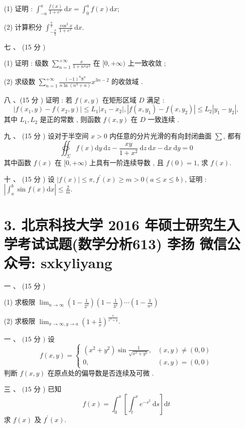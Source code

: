 \documentclass[10pt]{article}
\begin{document}
{(1)  证明 : $\int_{-a}^{a} \frac{f(x)}{1+e^{x}} \mathrm{~d} x=\int_{0}^{a} f(x) \mathrm{d} x$;

(2)  计算积分  $\int_{-\frac{\pi}{2}}^{\frac{\pi}{2}} \frac{\cos ^{3} x}{1+e^{x}} \mathrm{~d} x$.

 七 、 (15  分 )

(1)  证明 :  级数  $\sum_{n=1}^{+\infty} \frac{x}{1+n^{4} x^{2}}$  在  $[0,+\infty)$  上一致收敛 ;

(2)  求级数  $\sum_{n=1}^{+\infty} \frac{(-1)^{n} 8^{n}}{n \ln \left(n^{3}+n\right)} x^{3 n-2}$  的收敛域 .

 八 、(15  分 )  证明 :  若  $f(x, y)$  在矩形区域  $D$  满足 :
$$
\left|f\left(x_{1}, y\right)-f\left(x_{2}, y\right)\right| \leq L_{1}\left|x_{1}-x_{2}\right|,\left|f\left(x, y_{1}\right)-f\left(x, y_{2}\right)\right| \leq L_{2}\left|y_{1}-y_{2}\right|,
$$
 其中  $L_{1}, L_{2}$  是正的常数 ,  则函数  $f(x, y)$  在  $D$  一致连续 .

 九 、 (15  分 )  设对于半空间  $x>0$  内任意的分片光滑的有向封闭曲面  $\sum$,  都有 
$$
\oiint_{\Sigma} f(x) \mathrm{d} y \mathrm{~d} z-\frac{x y}{1+x^{2}} \mathrm{~d} z \mathrm{~d} x-\mathrm{d} x \mathrm{~d} y=0
$$
 其中函数  $f(x)$  在  $[0,+\infty)$  上具有一阶连续导数 ,  且  $f(0)=1$,  求  $f(x)$.

 十 、 (15  分 )  设  $|f(x)| \leq \pi, f^{\prime}(x) \geq m>0(a \leq x \leq b)$,  证明 : $\left|\int_{a}^{b} \sin f(x) \mathrm{d} x\right| \leq \frac{2}{m}$.

\section{3. 北京科技大学 2016 年硕士研究生入学考试试题(数学分析613) 
 李扬 
 微信公众号: sxkyliyang}
 一 、 (15  分 )

(1)  求极限  $\lim _{n \rightarrow \infty}\left(1-\frac{1}{2^{2}}\right)\left(1-\frac{1}{3^{2}}\right) \cdots\left(1-\frac{1}{n^{2}}\right)$

(2)  求极限  $\lim _{x \rightarrow \infty, y \rightarrow a}\left(1+\frac{1}{x}\right)^{\frac{x}{x^{2}+y}}$.

 一 、 $(15$  分  $)$  设 
$$
f(x, y)=\left\{\begin{array}{cc}
\left(x^{2}+y^{2}\right) \sin \frac{1}{\sqrt{x^{2}+y^{2}}}, & (x, y) \neq(0,0) \\
0, & (x, y)=(0,0)
\end{array}\right.
$$
 判断  $f(x, y)$  在原点处的偏导数是否连续及可微 .

 三 、 $(15$  分 )  已知 
$$
f(x)=\int_{0}^{x}\left[\int_{t}^{x} e^{-s^{2}} \mathrm{~d} s\right] \mathrm{d} t
$$
 求  $f(x)$  及  $f^{\prime}(x)$.

}
\end{document}
